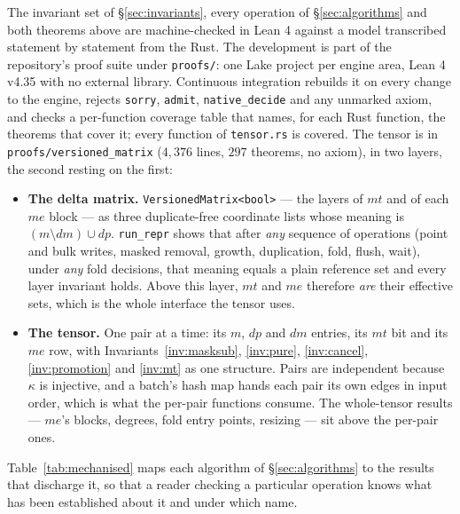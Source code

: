 \documentclass[11pt,a4paper]{article}
\theoremstyle{plain}
\theoremstyle{definition}
\theoremstyle{remark}
\begin{document}
The invariant set of \S\ref{sec:invariants}, every operation of
\S\ref{sec:algorithms} and both theorems above are machine-checked in Lean 4
against a model transcribed statement by statement from the Rust. The
development is part of the repository's proof suite under \texttt{proofs/}: one
Lake project per engine area, Lean 4 v4.35 with no external library. Continuous
integration rebuilds it on every change to the engine, rejects \texttt{sorry},
\texttt{admit}, \texttt{native\_decide} and any unmarked axiom, and checks a
per-function coverage table that names, for each Rust function, the theorems
that cover it; every function of \texttt{tensor.rs} is covered. The tensor is in
\texttt{proofs/versioned\_matrix} ($4{,}376$ lines, $297$ theorems, no axiom),
in two layers, the second resting on the first:

\begin{itemize}
\item \textbf{The delta matrix.} \texttt{VersionedMatrix<bool>} --- the layers
  of $mt$ and of each $me$ block --- as three duplicate-free coordinate lists
  whose meaning is $(m \setminus dm) \cup dp$. \texttt{run\_repr} shows that
  after \emph{any} sequence of operations (point and bulk writes, masked
  removal, growth, duplication, fold, flush, wait), under \emph{any} fold
  decisions, that meaning equals a plain reference set and every layer
  invariant holds. Above this layer, $mt$ and $me$ therefore \emph{are} their
  effective sets, which is the whole interface the tensor uses.
\item \textbf{The tensor.} One pair at a time: its $m$, $dp$ and $dm$ entries,
  its $mt$ bit and its $me$ row, with Invariants~\ref{inv:masksub},
  \ref{inv:pure}, \ref{inv:cancel}, \ref{inv:promotion} and \ref{inv:mt} as one
  structure. Pairs are independent because $\kappa$ is injective, and a batch's
  hash map hands each pair its own edges in input order, which is what the
  per-pair functions consume. The whole-tensor results --- $me$'s blocks,
  degrees, fold entry points, resizing --- sit above the per-pair ones.
\end{itemize}

Table~\ref{tab:mechanised} maps each algorithm of \S\ref{sec:algorithms} to the
results that discharge it, so that a reader checking a particular operation
knows what has been established about it and under which name.
\end{document}
